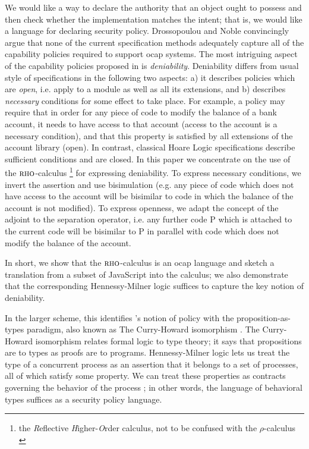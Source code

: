 \documentclass[]{acm_proc_article-sp}
\numberwithin{equation}{subsection}
\newcommand{\rhoc}{${\textsc{rho}}$-calculus}
\begin{document}
We would like a way to declare the authority that an object ought to
possess and then check whether the implementation matches the intent;
that is, we would like a language for declaring security policy.
Drossopoulou and Noble \cite{Drossopoulou:2013:NCP:2489804.2489811}
convincingly argue that none of the current specification methods
adequately capture all of the capability policies required to support
ocap systems. The most intriguing aspect of the capability policies
proposed in \cite{Drossopoulou:2013:NCP:2489804.2489811} is {\em
  deniability}. Deniability differs from usual style of specifications
in the following two aspects: a) it describes policies which are {\em
  open}, i.e. apply to a module as well as all its extensions, and b)
describes {\em necessary} conditions for some effect to take
place. For example, a policy may require that in order for any piece
of code to modify the balance of a bank account, it needs to have
access to that account (access to the account is a necessary
condition), and that this property is satisfied by all extensions of
the account library (open). In contrast, classical Hoare Logic
specifications \cite{Hoare:1969:ABC:363235.363259} describe sufficient
conditions and are closed.  In this paper we concentrate on the use of
the {\rhoc} \cite{DBLP:conf/tgc/MeredithR05} \footnote{the
  \emph{R}eflective \emph{H}igher-\emph{O}rder calculus, not to
  be confused with the $\rho$-calculus
  \cite{CirsteaFaureKirchnerWLRA2004}} for expressing deniability. To
express necessary conditions, we invert the assertion and use
bisimulation (e.g. any piece of code which does not have access to the
account will be bisimilar to code in which the balance of the account
is not modified). To express openness, we adapt the concept of the
adjoint to the separation operator, i.e. any further code P which is
attached to the current code will be bisimilar to P in parallel with
code which does not modify the balance of the account.

In short, we show that the \rhoc\; is an ocap language and sketch a
translation from a subset of JavaScript into the calculus; we also
demonstrate that the corresponding Hennessy-Milner logic suffices to
capture the key notion of deniability.

In the larger scheme, this identifies
\cite{Drossopoulou:2013:NCP:2489804.2489811}'s notion of policy with
the proposition-as-types paradigm, also known as The Curry-Howard isomorphism
\cite{Abramsky:1992:PP:194588.194591}
\cite{Krivine-TheCurryHowardCorre}. The Curry-Howard isomorphism
relates formal logic to type theory; it says that propositions are to
types as proofs are to programs.  Hennessy-Milner logic lets us treat
the type of a concurrent process as an assertion that it belongs to a
set of processes, all of which satisfy some property.  We can treat
these properties as contracts governing the behavior of the process
\cite{Meredith:2003:CT:944217.944236}; in other words, the language of
behavioral types suffices as a security policy language.
\end{document}
